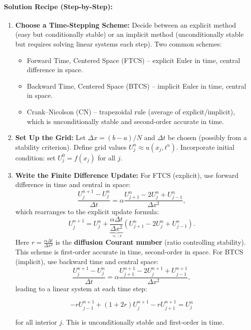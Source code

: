 \documentclass[a4paper,11pt]{article}
\begin{document}
\paragraph{Solution Recipe (Step-by-Step):}
\begin{enumerate}
    \item \textbf{Choose a Time-Stepping Scheme:} Decide between an explicit method (easy but conditionally stable) or an implicit method (unconditionally stable but requires solving linear systems each step). Two common schemes:
          \begin{itemize}
              \item Forward Time, Centered Space (FTCS) -- explicit Euler in time, central difference in space.
              \item Backward Time, Centered Space (BTCS) -- implicit Euler in time, central in space.
              \item Crank--Nicolson (CN) -- trapezoidal rule (average of explicit/implicit), which is unconditionally stable and second-order accurate in time.
          \end{itemize}
    \item \textbf{Set Up the Grid:} Let $\Delta x = (b-a)/N$ and $\Delta t$ be chosen (possibly from a stability criterion). Define grid values $U_j^n \approx u(x_j, t^n)$. Incorporate initial condition: set $U_j^0 = f(x_j)$ for all $j$.
    \item \textbf{Write the Finite Difference Update:} For FTCS (explicit), use forward difference in time and central in space:
          $$\frac{U_j^{n+1}-U_j^n}{\Delta t} = \alpha\frac{U_{j+1}^n - 2U_j^n + U_{j-1}^n}{\Delta x^2},$$ which rearranges to the explicit update formula:
          $$U_j^{n+1} = U_j^n + \underbrace{\frac{\alpha\Delta t}{\Delta x^2}}_{=:r}\left(U_{j+1}^n - 2U_j^n + U_{j-1}^n\right).$$
          Here $r = \frac{\alpha\Delta t}{\Delta x^2}$ is the \textbf{diffusion Courant number} (ratio controlling stability)\cite{ddcampayo}.
          This scheme is first-order accurate in time, second-order in space.
          \medskip
          For BTCS (implicit), use backward time and central space:
          $$\frac{U_j^{n+1}-U_j^n}{\Delta t} = \alpha\frac{U_{j+1}^{n+1} - 2U_j^{n+1} + U_{j-1}^{n+1}}{\Delta x^2},$$
          leading to a linear system at each time step:

          $$-rU_{j-1}^{n+1} + (1+2r) U_j^{n+1} - rU_{j+1}^{n+1} = U_j^n$$

          for all interior $j$.
          This is unconditionally stable and first-order in time.


\end{enumerate}
\end{document}
